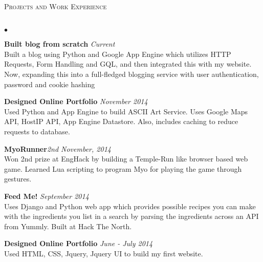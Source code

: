 \documentclass{article}
\newcommand{\lineunder}{\vspace*{-8pt} \\ \hspace*{-18pt} \hrulefill \\}
\newcommand{\header}[1]{{\hspace*{-15pt}\vspace*{6pt} \textsc{#1}} \vspace*{-6pt} \lineunder}
\newenvironment{achievements}{\begin{list}{$\bullet$}{\topsep 0pt \itemsep -1.5pt \leftmargin 5pt}}{\vspace*{4pt}\end{list}}
\begin{document}
\header{Projects and Work Experience}
\begin{achievements}
\item \textbf{Built blog from scratch} \hfill \textit {Current}
\\ Built a blog using Python and Google App Engine which utilizes HTTP Requests, Form Handling and GQL, and then integrated this with my website. Now, expanding this into a full-fledged blogging service with user authentication, password and cookie hashing
\item \textbf{Designed Online Portfolio} \hfill \textit {November 2014}
\\ Used Python and App Engine to build ASCII Art Service. Uses Google Maps API, HostIP API, App Engine Datastore. Also, includes caching to reduce requests to database. 
\item\textbf{MyoRunner}\hfill\textit{2nd November, 2014}
\\ Won 2nd prize at EngHack by building a Temple-Run like browser based web game. Learned Lua scripting to program Myo for playing the game through gestures. 
\item \textbf{Feed Me!} \hfill \textit {September 2014}
\\ Uses Django and Python web app which provides possible recipes you can make with the ingredients you list in a search by parsing the ingredients across an API from Yummly.  Built at Hack The North.
\item \textbf{Designed Online Portfolio} \hfill \textit {June - July 2014}
\\ Used HTML, CSS, Jquery, Jquery UI to build my first website. 

\vspace{7pt}


\end{achievements}
\end{document}
